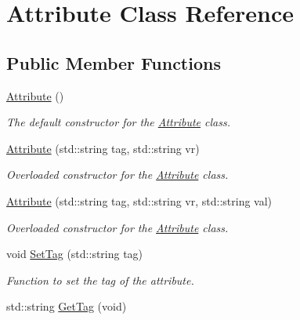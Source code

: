 \hypertarget{class_attribute}{
\section{Attribute Class Reference}
\label{class_attribute}
}
\subsection*{Public Member Functions}
\begin{DoxyCompactItemize}
\item 
\hypertarget{class_attribute_a8ba4e5a507aef352563e1e56f1930e66}{
\hyperlink{class_attribute_a8ba4e5a507aef352563e1e56f1930e66}{Attribute} ()}
\label{class_attribute_a8ba4e5a507aef352563e1e56f1930e66}

\begin{DoxyCompactList}\small\item\em The default constructor for the \hyperlink{class_attribute}{Attribute} class. \item\end{DoxyCompactList}\item 
\hyperlink{class_attribute_a6adf65411544dced1686f79c407e96cc}{Attribute} (std::string tag, std::string vr)
\begin{DoxyCompactList}\small\item\em Overloaded constructor for the \hyperlink{class_attribute}{Attribute} class. \item\end{DoxyCompactList}\item 
\hyperlink{class_attribute_adb7379d955891772438972c8115cd9be}{Attribute} (std::string tag, std::string vr, std::string val)
\begin{DoxyCompactList}\small\item\em Overloaded constructor for the \hyperlink{class_attribute}{Attribute} class. \item\end{DoxyCompactList}\item 
void \hyperlink{class_attribute_a7594af81a1d1ff8255df881868d745f1}{SetTag} (std::string tag)
\begin{DoxyCompactList}\small\item\em Function to set the tag of the attribute. \item\end{DoxyCompactList}\item 
std::string \hyperlink{class_attribute_a104ebad6ecf44626b5f9274baed3d372}{GetTag} (void)

\end{DoxyCompactItemize}
